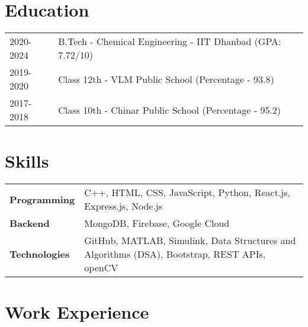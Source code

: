 \documentclass[a3paper,12pt]{article}
\begin{document}
\section{\textbf{Education}}
\begin{tabularx}{\linewidth}{@{}l X@{}}	

2020-2024 & B.Tech - Chemical Engineering - IIT Dhanbad \hfill (GPA: 7.72/10) \\ 
2019-2020 & Class 12th - VLM Public School \hfill  (Percentage - 93.8) \\
2017-2018 & Class 10th - Chinar Public School \hfill  (Percentage - 95.2) \\
\end{tabularx}






\section{\textbf{Skills}}
\begin{tabularx}{\linewidth}{@{}l X@{}}
\textbf{Programming} &  \normalsize{C++, HTML, CSS, JavaScript, Python, React.js, Express.js, Node.js}\\
\textbf{Backend}  &  \normalsize{MongoDB, Firebase, Google Cloud}\\ 
\textbf{Technologies}  &  \normalsize{GitHub, MATLAB, Simulink, Data Structures and Algorithms (DSA), Bootstrap, REST APIs, openCV}\\ 
\end{tabularx}






\section{\textbf{Work Experience}}
\end{document}
